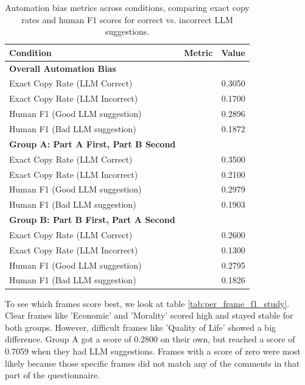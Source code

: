 \documentclass[
10pt, %
a4paper, %
oneside, %
headinclude,footinclude, %
] {book}%
\begin{document}
\begin{table}[htbp]
\centering
\begin{tabular}{lcc}
\toprule
\textbf{Condition} & \textbf{Metric} & \textbf{Value} \\
\midrule

\textbf{Overall Automation Bias} & & \\
Exact Copy Rate (LLM Correct) & & 0.3050 \\
Exact Copy Rate (LLM Incorrect) & & 0.1700 \\
Human F1 (Good LLM suggestion) & & 0.2896 \\
Human F1 (Bad LLM suggestion) & & 0.1872 \\

\midrule

\textbf{Group A: Part A First, Part B Second} & & \\
Exact Copy Rate (LLM Correct) & & 0.3500 \\
Exact Copy Rate (LLM Incorrect) & & 0.2100 \\
Human F1 (Good LLM suggestion) & & 0.2979 \\
Human F1 (Bad LLM suggestion) & & 0.1903 \\

\midrule

\textbf{Group B: Part B First, Part A Second} & & \\
Exact Copy Rate (LLM Correct) & & 0.2600 \\
Exact Copy Rate (LLM Incorrect) & & 0.1300 \\
Human F1 (Good LLM suggestion) & & 0.2795 \\
Human F1 (Bad LLM suggestion) & & 0.1826 \\

\bottomrule
\end{tabular}
\caption{Automation bias metrics across conditions, comparing exact copy rates and human F1 scores for correct vs. incorrect LLM suggestions.}
\label{tab:automation_bias_study}
\end{table}

To see which frames score best, we look at table \ref{tab:per_frame_f1_study}. Clear frames like 'Economic' and 'Morality' scored high and stayed stable for both groups. However, difficult frames like 'Quality of Life' showed a big difference. Group A got a score of 0.2800 on their own, but reached a score of 0.7059 when they had LLM suggestions. Frames with a score of zero were most likely because those specific frames did not match any of the comments in that part of the questionnaire.
\end{document}

